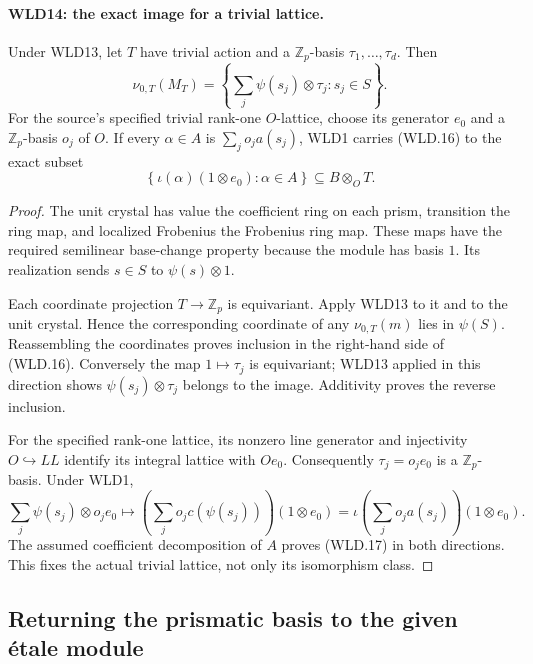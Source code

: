 \paragraph{WLD14: the exact image for a trivial lattice.}
\label{claim:WLD14}
Under WLD13, let $T$ have trivial action and a
$\mathbb Z_p$-basis $\tau_1,\ldots,\tau_d$. Then
\[
 \nu_{0,T}(M_T)
       =\left\{\sum_j\psi(s_j)\otimes\tau_j:s_j\in S\right\}.
                                                               \tag{WLD.16}
\]
For the source's specified trivial rank-one $O$-lattice,
choose its generator $e_0$ and a $\mathbb Z_p$-basis $o_j$ of $O$.
If every $\alpha\in A$ is $\sum_j o_ja(s_j)$, WLD1 carries
(WLD.16) to the exact subset
\[
      \left\{\iota(\alpha)(1\otimes e_0):\alpha\in A\right\}
                   \subseteq B\otimes_OT.                 \tag{WLD.17}
\]

\begin{proof}
The unit crystal has value the coefficient ring on each prism,
transition the ring map, and localized Frobenius the Frobenius
ring map. These maps have the required semilinear base-change
property because the module has basis $1$. Its realization sends
$s\in S$ to $\psi(s)\otimes1$.

Each coordinate projection $T\to\mathbb Z_p$ is equivariant.
Apply WLD13 to it and to the unit crystal. Hence the corresponding
coordinate of any $\nu_{0,T}(m)$ lies in $\psi(S)$. Reassembling
the coordinates proves inclusion in the right-hand side of
(WLD.16). Conversely the map $1\mapsto\tau_j$ is equivariant;
WLD13 applied in this direction shows
$\psi(s_j)\otimes\tau_j$ belongs to the image. Additivity proves
the reverse inclusion.

For the specified rank-one lattice, its nonzero line generator and
injectivity $O\hookrightarrow LL$ identify its integral lattice
with $Oe_0$. Consequently $\tau_j=o_je_0$ is a
$\mathbb Z_p$-basis. Under WLD1,
\[
 \sum_j\psi(s_j)\otimes o_je_0
       \longmapsto
       \left(\sum_j o_jc(\psi(s_j))\right)(1\otimes e_0)
       =\iota\left(\sum_j o_ja(s_j)\right)(1\otimes e_0).
\]
The assumed coefficient decomposition of $A$ proves (WLD.17)
in both directions. This fixes the actual trivial lattice, not
only its isomorphism class.
\end{proof}

\subsection{Returning the prismatic basis to the given \'etale module}

